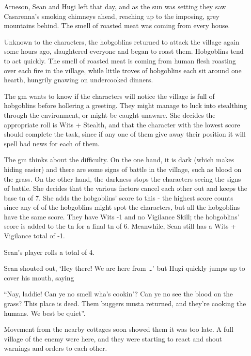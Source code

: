\begin{exampletext}

  Arneson, Sean and Hugi left that day, and as the sun was setting they saw Casarenna's smoking chimneys ahead, reaching up to the imposing, grey mountains behind.
  The smell of roasted meat was coming from every house.

  Unknown to the characters, the hobgoblins returned to attack the village again some hours ago, slaughtered everyone and began to roast them.
Hobgoblins tend to act quickly.
The smell of roasted meat is coming from human flesh roasting over each fire in the village, while little troves of hobgoblins each sit around one hearth, hungrily gnawing on undercooked dinners.

  The \gls{gm} wants to know if the characters will notice the village is full of hobgoblins before hollering a greeting.
  They might manage to luck into stealthing through the environment, or might be caught unaware.
  She decides the appropriate roll is Wits + Stealth, and that the character with the lowest score should complete the task, since if any one of them give away their position it will spell bad news for each of them.

  The \gls{gm} thinks about the difficulty.
  On the one hand, it is dark (which makes hiding easier) and there are some signs of battle in the village, such as blood on the grass.
  On the other hand, the darkness stops the characters seeing the signs of battle.
  She decides that the various factors cancel each other out and keeps the base \gls{tn} of 7.
  She adds the hobgoblins' score to this - the highest score counts since any of of the hobgoblins might spot the characters, but all the hobgoblins have the same score.
  They have Wits -1 and no Vigilance Skill; the hobgoblins' score is added to the \gls{tn} for a final \gls{tn} of 6.
  Meanwhile, Sean still has a Wits + Vigilance total of -1.

  Sean's player rolls a total of 4.

  Sean shouted out, `Hey there! We are here from \dots' but Hugi quickly jumps up to cover his mouth, saying

  ``Nay, laddie! Can ye no smell wha's cookin'? Can ye no see the blood on the grass? This place is deed. Them buggers musta returned, and they're cooking the humans. We best be quiet''.

  Movement from the nearby cottages soon showed them it was too late. A full village of the enemy were here, and they were starting to react and shout warnings and orders to each other.

\end{exampletext}

